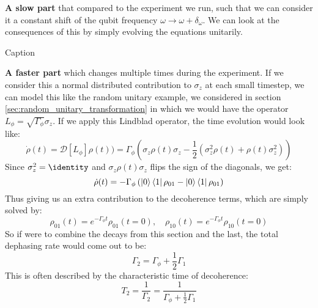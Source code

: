 \textbf{A slow part} that compared to the experiment we run, such that we can consider it a constant shift of the qubit frequency $\omega \to \omega + \delta_\omega$. We can look at the consequences of this by simply evolving the equations unitarily. 

\begin{marginfigure}
    \centering
    \caption{Caption}
    \label{fig:enter-label}
\end{marginfigure}

\textbf{A faster part} which changes multiple times during the experiment. If we consider this a normal distributed contribution to $\sigma_z$ at each small timestep, we can model this like the random unitary example, we considered in section \ref{sec:random_unitary_transformation} in which we would have the operator $L_\phi = \sqrt{\Gamma_\phi}\sigma_z$. If we apply this Lindblad operator, the time evolution would look like:
\begin{equation}
    \dot{\rho}(t) = \mathcal{D}[L_{\phi}]\rho(t)) = \Gamma_\phi\left(\sigma_z \rho(t) \sigma_z -\frac12( \sigma_z^2 \rho(t) + \rho(t) \sigma_z^2)\right)
\end{equation}
Since $\sigma_z^2 = \identity$ and $\sigma_z \rho(t) \sigma_z$ flips the sign of the diagonals, we get:
\begin{equation}
    \dot{\rho}(t) = - \Gamma_\phi \left(\ket{0}\bra{1}\rho_{01} - \ket{0}\bra{1}\rho_{01}\right)
\end{equation}
Thus giving us an extra contribution to the decoherence terms, which are simply solved by:
\begin{equation}
    \rho_{01}(t) = e^{-\Gamma_\phi t}\rho_{01}(t=0), \quad \rho_{10}(t) = e^{-\Gamma_\phi t}\rho_{10}(t=0)
\end{equation}
So if were to combine the decays from this section and the last, the total dephasing rate would come out to be:
\begin{equation}
    \Gamma_2 = \Gamma_\phi + \frac12\Gamma_1 
\end{equation}
This is often described by the characteristic time of decoherence:
\begin{equation}
    T_2 = \frac{1}{\Gamma_2} = \frac{1}{\Gamma_\phi + \frac12\Gamma_1 } 
\end{equation}





